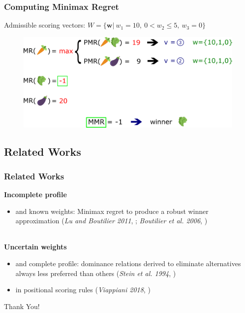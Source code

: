 \documentclass{beamer}
\begin{document}
\begin{frame}
	\frametitle{Computing Minimax Regret}
		Admissible scoring vectors: $W=\{\mathbf{w}| \ w_1=10, \ 0 < w_2 \leq 5, \ w_3=0\}$~\vspace*{10px}
		\begin{figure}
			\includegraphics[scale=0.32]{comp.png}
		\end{figure}
\end{frame}

\subsection{Related Works}
\begin{frame}
	\frametitle{Related Works}
	\textbf{Incomplete profile}  
	\begin{itemize}
		\item and known weights: Minimax regret to produce a robust winner approximation (\textit{Lu and Boutilier 2011}, \cite{Lu2011}; \textit{Boutilier et al. 2006}, \cite{Boutilier2006})
	\end{itemize}~\\
	\textbf{Uncertain weights} 
	\begin{itemize}
		\item and complete profile: dominance relations derived to eliminate alternatives always less preferred than others (\textit{Stein et al. 1994}, \cite{Stein1994})
		\item in positional scoring rules (\textit{Viappiani 2018}, \cite{Viappiani2018})
	\end{itemize}
\end{frame}

\addtocounter{framenumber}{-1}
\begin{frame}[plain]
	\centering \color{darkred}\LARGE Thank You!
\end{frame}





 


\end{document}
